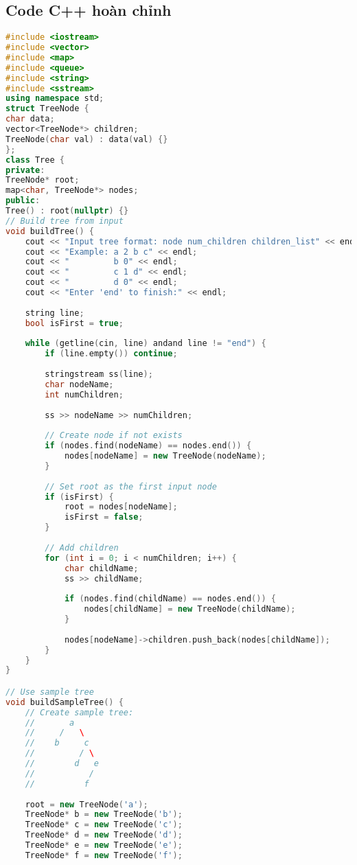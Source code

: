 \documentclass[12pt]{article}
\begin{document}
\subsection{Code C++ hoàn chỉnh}
\begin{lstlisting}[language=C++, caption=Chương trình duyệt cây C++]
#include <iostream>
#include <vector>
#include <map>
#include <queue>
#include <string>
#include <sstream>
using namespace std;
struct TreeNode {
char data;
vector<TreeNode*> children;
TreeNode(char val) : data(val) {}
};
class Tree {
private:
TreeNode* root;
map<char, TreeNode*> nodes;
public:
Tree() : root(nullptr) {}
// Build tree from input
void buildTree() {
    cout << "Input tree format: node num_children children_list" << endl;
    cout << "Example: a 2 b c" << endl;
    cout << "         b 0" << endl;
    cout << "         c 1 d" << endl;
    cout << "         d 0" << endl;
    cout << "Enter 'end' to finish:" << endl;
    
    string line;
    bool isFirst = true;
    
    while (getline(cin, line) andand line != "end") {
        if (line.empty()) continue;
        
        stringstream ss(line);
        char nodeName;
        int numChildren;
        
        ss >> nodeName >> numChildren;
        
        // Create node if not exists
        if (nodes.find(nodeName) == nodes.end()) {
            nodes[nodeName] = new TreeNode(nodeName);
        }
        
        // Set root as the first input node
        if (isFirst) {
            root = nodes[nodeName];
            isFirst = false;
        }
        
        // Add children
        for (int i = 0; i < numChildren; i++) {
            char childName;
            ss >> childName;
            
            if (nodes.find(childName) == nodes.end()) {
                nodes[childName] = new TreeNode(childName);
            }
            
            nodes[nodeName]->children.push_back(nodes[childName]);
        }
    }
}

// Use sample tree
void buildSampleTree() {
    // Create sample tree:
    //       a
    //     /   \
    //    b     c
    //         / \
    //        d   e
    //           /
    //          f
    
    root = new TreeNode('a');
    TreeNode* b = new TreeNode('b');
    TreeNode* c = new TreeNode('c');
    TreeNode* d = new TreeNode('d');
    TreeNode* e = new TreeNode('e');
    TreeNode* f = new TreeNode('f');
    

\end{lstlisting}
\end{document}
